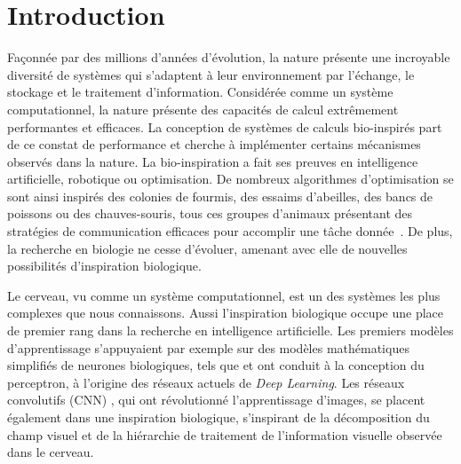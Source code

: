 \chapter*{Introduction}

Façonnée par des millions d'années d'évolution, la nature présente une incroyable diversité de systèmes qui s'adaptent à leur environnement par l'échange, le stockage et le traitement d'information.
Considérée comme un système computationnel, la nature présente des capacités de calcul extrêmement performantes et efficaces. 
La conception de systèmes de calculs bio-inspirés part de ce constat de performance et cherche à implémenter certains mécanismes observés dans la nature.
La bio-inspiration a fait ses preuves en intelligence artificielle, robotique ou optimisation. De nombreux algorithmes d'optimisation se sont ainsi inspirés des colonies de fourmis, des essaims d'abeilles, des bancs de poissons ou des chauves-souris, tous ces groupes d'animaux présentant des stratégies de communication efficaces pour accomplir une tâche donnée~\parencite{Darwish2018BioinspiredCA}.
De plus, la recherche en biologie ne cesse d'évoluer, amenant avec elle de nouvelles possibilités d'inspiration biologique.

Le cerveau, vu comme un système computationnel, est un des systèmes les plus complexes que nous connaissons.
Aussi l'inspiration biologique occupe une place de premier rang dans la recherche en intelligence artificielle. Les premiers modèles d'apprentissage s'appuyaient par exemple sur des modèles mathématiques simplifiés de neurones biologiques, tels que \cite{McCulloch1990ALC} et ont conduit à la conception du perceptron, à l'origine des réseaux actuels de \emph{Deep Learning}. Les réseaux convolutifs (CNN) \parencite{LeCun1998ConvolutionalNF}, qui ont révolutionné l'apprentissage d'images, se placent également dans une inspiration biologique, s'inspirant de la décomposition du champ visuel et de la hiérarchie de traitement de l'information visuelle observée dans le cerveau.

